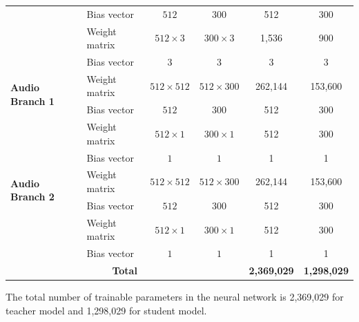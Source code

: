 \begin{table}[H]
{\begin{tabular}{|p{6em}|l|c|c|c|c|}
                                  & Bias vector                     & $512$               & $300$               & 512                 & 300                 \\
                                  & Weight matrix                   & $512 \times 3$      & $300 \times 3$      & 1,536               & 900                 \\
                                  & Bias vector                     & $3$                 & $3$                 & 3                   & 3                   \\ \hline
    \multirow{2}{5em}{\textbf{Audio Branch 1}}       & Weight matrix                   & $512 \times 512$    & $512 \times 300$    & 262,144             & 153,600             \\
                                  & Bias vector                     & $512$               & $300$               & 512                 & 300                 \\
                                  & Weight matrix                   & $512 \times 1$      & $300 \times 1$      & 512                 & 300                 \\
                                  & Bias vector                     & $1$                 & $1$                 & 1                   & 1                   \\ \hline
    \multirow{2}{5em}{\textbf{Audio Branch 2}}       & Weight matrix                   & $512 \times 512$    & $512 \times 300$    & 262,144             & 153,600             \\
                                  & Bias vector                     & $512$               & $300$               & 512                 & 300                 \\
                                  & Weight matrix                   & $512 \times 1$      & $300 \times 1$      & 512                 & 300                 \\
                                  & Bias vector                     & $1$                 & $1$                 & 1                   & 1                   \\ \hline
    \multicolumn{4}{|c|}{\textbf{Total}}  & \textbf{2,369,029}  & \textbf{1,298,029} \\ \hline
    \end{tabular}
    }
\end{table}


The total number of trainable parameters in the neural network is 2,369,029 for teacher model and 1,298,029 for student model.

